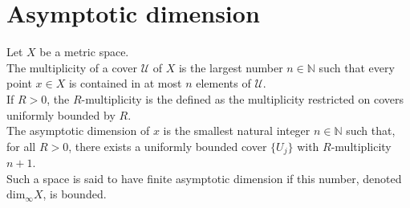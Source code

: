 \section{Asymptotic dimension}

\begin{definition}
Let $X$ be a metric space. \\
The multiplicity of a cover $\mathcal U$ of $X$ is the largest number $n\in \mathbb N$ such that every point $x\in X$ is contained in at most $n$ elements of $\mathcal U$.\\
If $R>0$, the $R$-multiplicity is the defined as the multiplicity restricted on covers uniformly bounded by $R$.\\
The asymptotic dimension of $x$ is the smallest natural integer $n\in \mathbb N$ such that, for all $R>0$, there exists a uniformly bounded cover $\{U_j\}$ with $R$-multiplicity $n+1$.\\
Such a space is said to have finite asymptotic dimension if this number, denoted $\text{dim}_\infty X$, is bounded.\\
\end{definition}